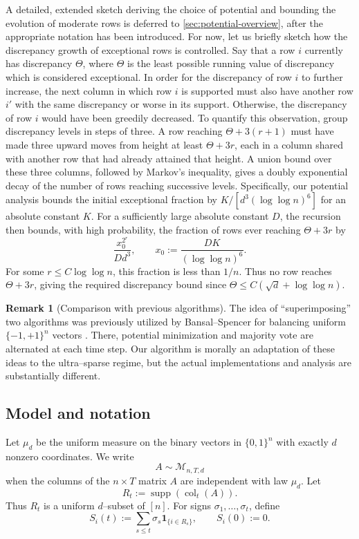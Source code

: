 \documentclass[reqno,english]{amsart}
\newcommand*{\calM}{\mathcal M}
\newcommand*{\ind}{\mathbf 1}
\newcommand*{\supp}{\operatorname{supp}}
\newcommand*{\col}{\operatorname{col}}
\theoremstyle{definition}
\newtheorem{remark}[remark]{Remark}
\begin{document}
A detailed, extended sketch deriving the choice of potential and bounding the evolution of moderate rows is deferred to \cref{sec:potential-overview}, after the appropriate notation has been introduced. For now, let us briefly sketch how the discrepancy growth of exceptional rows is controlled. Say that a row $i$ currently has discrepancy $\Theta$, where $\Theta$ is the least possible running value of discrepancy which is considered exceptional. In order for the discrepancy of row $i$ to further increase, the next column in which row $i$ is supported must also have another row $i'$ with the same discrepancy or worse in its support. Otherwise, the discrepancy of row $i$ would have been greedily decreased. To quantify this observation, group discrepancy levels in steps of three. A row reaching $\Theta+3(r+1)$ must have made three upward moves from height at least $\Theta+3r$, each in a column shared with another row that had already attained that height. A union bound over these three columns, followed by Markov's inequality, gives a doubly exponential decay of the number of rows reaching successive levels. Specifically, our potential analysis bounds the initial exceptional fraction by $K/[d^3(\log\log n)^6]$ for an absolute constant $K$. For a sufficiently large absolute constant $D$, the recursion then bounds, with high probability, the fraction of rows ever reaching $\Theta+3r$ by
\[
    \frac{x_0^{2^r}}{Dd^3},
    \qquad x_0:=\frac{DK}{(\log\log n)^6}.
\]
For some $r\le C\log\log n$, this fraction is less than $1/n$. Thus no row reaches $\Theta+3r$, giving the required discrepancy bound since $\Theta\le C(\sqrt d+\log\log n)$. 

\begin{remark}[Comparison with previous algorithms]
    The idea of ``superimposing'' two algorithms was previously utilized by Bansal--Spencer for balancing uniform $\{-1,+1\}^n$ vectors \cite{bansal-spencer}. There, potential minimization and majority vote are alternated at each time step. Our algorithm is morally an adaptation of these ideas to the ultra--sparse regime, but the actual implementations and analysis are substantially different.
\end{remark}


\subsection{Model and notation}

Let $\mu_d$ be the uniform measure on the binary vectors in $\{0,1\}^n$ with
exactly $d$ nonzero coordinates.  We write
\[
    A\sim\calM_{n,T,d}
\]
when the columns of the $n\times T$ matrix $A$ are independent with law
$\mu_d$.  Let
\[
    R_t:=\supp(\col_t(A)).
\]
Thus $R_t$ is a uniform $d$--subset of $[n]$.  For signs
$\sigma_1,\ldots,\sigma_t$, define
\begin{equation}\label{eq:running-discrepancy}
    S_i(t):=\sum_{s\le t}\sigma_s\ind_{\{i\in R_s\}},
    \qquad S_i(0):=0.
\end{equation}
\end{document}
